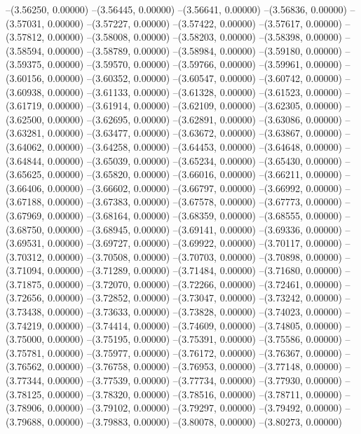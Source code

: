 --(3.56250, 0.00000)
--(3.56445, 0.00000)
--(3.56641, 0.00000)
--(3.56836, 0.00000)
--(3.57031, 0.00000)
--(3.57227, 0.00000)
--(3.57422, 0.00000)
--(3.57617, 0.00000)
--(3.57812, 0.00000)
--(3.58008, 0.00000)
--(3.58203, 0.00000)
--(3.58398, 0.00000)
--(3.58594, 0.00000)
--(3.58789, 0.00000)
--(3.58984, 0.00000)
--(3.59180, 0.00000)
--(3.59375, 0.00000)
--(3.59570, 0.00000)
--(3.59766, 0.00000)
--(3.59961, 0.00000)
--(3.60156, 0.00000)
--(3.60352, 0.00000)
--(3.60547, 0.00000)
--(3.60742, 0.00000)
--(3.60938, 0.00000)
--(3.61133, 0.00000)
--(3.61328, 0.00000)
--(3.61523, 0.00000)
--(3.61719, 0.00000)
--(3.61914, 0.00000)
--(3.62109, 0.00000)
--(3.62305, 0.00000)
--(3.62500, 0.00000)
--(3.62695, 0.00000)
--(3.62891, 0.00000)
--(3.63086, 0.00000)
--(3.63281, 0.00000)
--(3.63477, 0.00000)
--(3.63672, 0.00000)
--(3.63867, 0.00000)
--(3.64062, 0.00000)
--(3.64258, 0.00000)
--(3.64453, 0.00000)
--(3.64648, 0.00000)
--(3.64844, 0.00000)
--(3.65039, 0.00000)
--(3.65234, 0.00000)
--(3.65430, 0.00000)
--(3.65625, 0.00000)
--(3.65820, 0.00000)
--(3.66016, 0.00000)
--(3.66211, 0.00000)
--(3.66406, 0.00000)
--(3.66602, 0.00000)
--(3.66797, 0.00000)
--(3.66992, 0.00000)
--(3.67188, 0.00000)
--(3.67383, 0.00000)
--(3.67578, 0.00000)
--(3.67773, 0.00000)
--(3.67969, 0.00000)
--(3.68164, 0.00000)
--(3.68359, 0.00000)
--(3.68555, 0.00000)
--(3.68750, 0.00000)
--(3.68945, 0.00000)
--(3.69141, 0.00000)
--(3.69336, 0.00000)
--(3.69531, 0.00000)
--(3.69727, 0.00000)
--(3.69922, 0.00000)
--(3.70117, 0.00000)
--(3.70312, 0.00000)
--(3.70508, 0.00000)
--(3.70703, 0.00000)
--(3.70898, 0.00000)
--(3.71094, 0.00000)
--(3.71289, 0.00000)
--(3.71484, 0.00000)
--(3.71680, 0.00000)
--(3.71875, 0.00000)
--(3.72070, 0.00000)
--(3.72266, 0.00000)
--(3.72461, 0.00000)
--(3.72656, 0.00000)
--(3.72852, 0.00000)
--(3.73047, 0.00000)
--(3.73242, 0.00000)
--(3.73438, 0.00000)
--(3.73633, 0.00000)
--(3.73828, 0.00000)
--(3.74023, 0.00000)
--(3.74219, 0.00000)
--(3.74414, 0.00000)
--(3.74609, 0.00000)
--(3.74805, 0.00000)
--(3.75000, 0.00000)
--(3.75195, 0.00000)
--(3.75391, 0.00000)
--(3.75586, 0.00000)
--(3.75781, 0.00000)
--(3.75977, 0.00000)
--(3.76172, 0.00000)
--(3.76367, 0.00000)
--(3.76562, 0.00000)
--(3.76758, 0.00000)
--(3.76953, 0.00000)
--(3.77148, 0.00000)
--(3.77344, 0.00000)
--(3.77539, 0.00000)
--(3.77734, 0.00000)
--(3.77930, 0.00000)
--(3.78125, 0.00000)
--(3.78320, 0.00000)
--(3.78516, 0.00000)
--(3.78711, 0.00000)
--(3.78906, 0.00000)
--(3.79102, 0.00000)
--(3.79297, 0.00000)
--(3.79492, 0.00000)
--(3.79688, 0.00000)
--(3.79883, 0.00000)
--(3.80078, 0.00000)
--(3.80273, 0.00000)
